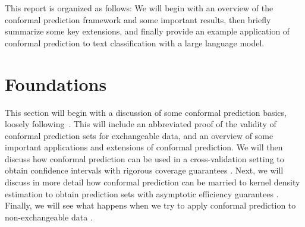 \documentclass[a4paper, 12pt]{article}
\begin{document}
This report is organized as follows: We will begin with an overview of the conformal prediction framework and some important results, then briefly summarize some key extensions, and finally provide an example application of conformal prediction to text classification with a large language model.

\section{Foundations}
This section will begin with a discussion of some conformal prediction basics,
loosely following~\cite{angelopoulosGentleIntroductionConformal2022}.
This will include an abbreviated proof of the validity of conformal prediction sets for exchangeable data,
and an overview of some important applications and extensions of conformal prediction.
We will then discuss how conformal prediction can be used in a cross-validation setting to obtain confidence intervals with rigorous coverage guarantees \autocite{barberPredictiveInferenceJackknife2020}.
Next, we will discuss in more detail how conformal prediction can be married to kernel density estimation to obtain prediction sets with asymptotic efficiency
guarantees \autocite{leiDistributionFreePrediction2013}.
Finally, we will see what happens when we try to apply conformal prediction to
non-exchangeable data \autocite{barberConformalPredictionExchangeability2023}.
\end{document}
